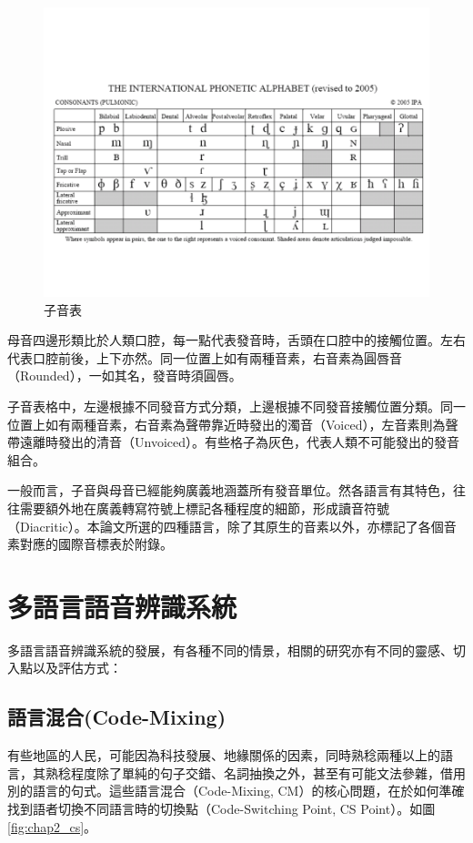 \begin{figure}
\centering
\includegraphics[scale=0.4]{images/chap2_consonant.png}
\caption{子音表}
\label{fig:consonant}
\end{figure}
母音四邊形類比於人類口腔，每一點代表發音時，舌頭在口腔中的接觸位置。左右代表口腔前後，上下亦然。同一位置上如有兩種音素，右音素為圓唇音（Rounded），一如其名，發音時須圓唇。

子音表格中，左邊根據不同發音方式分類，上邊根據不同發音接觸位置分類。同一位置上如有兩種音素，右音素為聲帶靠近時發出的濁音（Voiced），左音素則為聲帶遠離時發出的清音（Unvoiced）。有些格子為灰色，代表人類不可能發出的發音組合。

一般而言，子音與母音已經能夠廣義地涵蓋所有發音單位。然各語言有其特色，往往需要額外地在廣義轉寫符號上標記各種程度的細節，形成讀音符號（Diacritic）。本論文所選的四種語言，除了其原生的音素以外，亦標記了各個音素對應的國際音標表於附錄。

\section{多語言語音辨識系統}
多語言語音辨識系統的發展，有各種不同的情景，相關的研究亦有不同的靈感、切入點以及評估方式：
\subsection{語言混合(Code-Mixing)}
有些地區的人民，可能因為科技發展、地緣關係的因素，同時熟稔兩種以上的語言，其熟稔程度除了單純的句子交錯、名詞抽換之外，甚至有可能文法參雜，借用別的語言的句式。這些語言混合（Code-Mixing, CM）的核心問題，在於如何準確找到語者切換不同語言時的切換點（Code-Switching Point, CS Point）。如圖\ref{fig:chap2_cs}。

